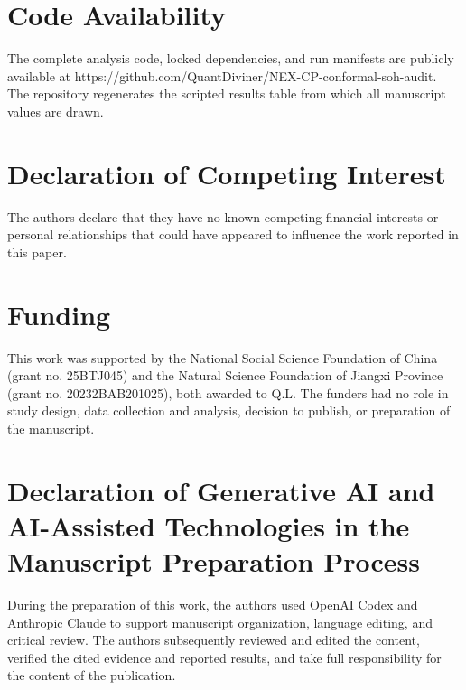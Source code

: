 \documentclass[
  number,
  preprint]{elsarticle}
\begin{document}
\section*{Code Availability}\label{code-availability}

The complete analysis code, locked dependencies, and run manifests are
publicly available at
https://github.com/QuantDiviner/NEX-CP-conformal-soh-audit. The
repository regenerates the scripted results table from which all
manuscript values are drawn.

\section*{Declaration of Competing
Interest}\label{declaration-of-competing-interest}

The authors declare that they have no known competing financial
interests or personal relationships that could have appeared to
influence the work reported in this paper.

\section*{Funding}\label{funding}

This work was supported by the National Social Science Foundation of
China (grant no. 25BTJ045) and the Natural Science Foundation of Jiangxi
Province (grant no. 20232BAB201025), both awarded to Q.L. The funders
had no role in study design, data collection and analysis, decision to
publish, or preparation of the manuscript.

\section*{Declaration of Generative AI and AI-Assisted Technologies in
the Manuscript Preparation
Process}\label{declaration-of-generative-ai-and-ai-assisted-technologies-in-the-manuscript-preparation-process}

During the preparation of this work, the authors used OpenAI Codex and
Anthropic Claude to support manuscript organization, language editing,
and critical review. The authors subsequently reviewed and edited the
content, verified the cited evidence and reported results, and take full
responsibility for the content of the publication.
\end{document}
